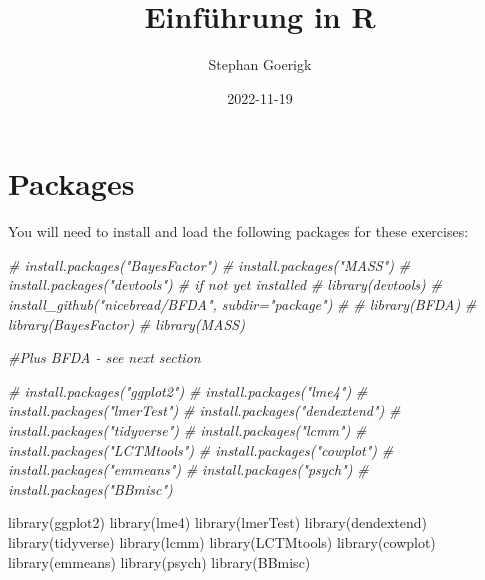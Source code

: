 \documentclass[
]{book}
\title{Einführung in R}
\author{Stephan Goerigk}
\date{2022-11-19}
\newenvironment{Shaded}{\begin{snugshade}}{\end{snugshade}}
\newcommand{\CommentTok}[1]{\textcolor[rgb]{0.56,0.35,0.01}{\textit{#1}}}
\newcommand{\FunctionTok}[1]{\textcolor[rgb]{0.00,0.00,0.00}{#1}}
\newcommand{\NormalTok}[1]{#1}
\begin{document}
\maketitle

{
\setcounter{tocdepth}{1}
\tableofcontents
}
\hypertarget{packages}{%
\chapter{Packages}\label{packages}}

You will need to install and load the following packages for these exercises:

\begin{Shaded}
\begin{Highlighting}[]
\CommentTok{\# install.packages("BayesFactor")}
\CommentTok{\# install.packages("MASS")}
\CommentTok{\# install.packages("devtools") \# if not yet installed}
\CommentTok{\# library(devtools)}
\CommentTok{\# install\_github("nicebread/BFDA", subdir="package")}
\CommentTok{\# }
\CommentTok{\# library(BFDA)}
\CommentTok{\# library(BayesFactor)}
\CommentTok{\# library(MASS)}

\CommentTok{\#Plus BFDA {-} see next section}
\end{Highlighting}
\end{Shaded}

\begin{Shaded}
\begin{Highlighting}[]
\CommentTok{\# install.packages("ggplot2")}
\CommentTok{\# install.packages("lme4")}
\CommentTok{\# install.packages("lmerTest")}
\CommentTok{\# install.packages("dendextend")}
\CommentTok{\# install.packages("tidyverse")}
\CommentTok{\# install.packages("lcmm")}
\CommentTok{\# install.packages("LCTMtools")}
\CommentTok{\# install.packages("cowplot")}
\CommentTok{\# install.packages("emmeans")}
\CommentTok{\# install.packages("psych")}
\CommentTok{\# install.packages("BBmisc")}

\FunctionTok{library}\NormalTok{(ggplot2)}
\FunctionTok{library}\NormalTok{(lme4)}
\FunctionTok{library}\NormalTok{(lmerTest)}
\FunctionTok{library}\NormalTok{(dendextend)}
\FunctionTok{library}\NormalTok{(tidyverse)}
\FunctionTok{library}\NormalTok{(lcmm)}
\FunctionTok{library}\NormalTok{(LCTMtools)}
\FunctionTok{library}\NormalTok{(cowplot)}
\FunctionTok{library}\NormalTok{(emmeans)}
\FunctionTok{library}\NormalTok{(psych)}
\FunctionTok{library}\NormalTok{(BBmisc)}
\end{Highlighting}
\end{Shaded}
\end{document}
